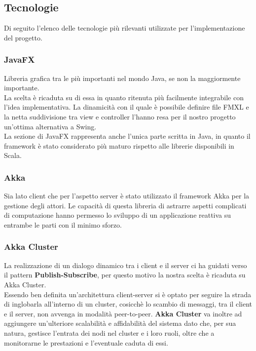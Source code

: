         \subsection{Tecnologie}\label{subsec:technologies}
        Di seguito l'elenco delle tecnologie più rilevanti utilizzate per l'implementazione del progetto.
	  \subsubsection{JavaFX}\label{subsub:tecnologie:javafx}
	    Libreria grafica tra le più importanti nel mondo Java, se non la maggiormente importante.
	    \\
	    La scelta è ricaduta su di essa in quanto ritenuta più facilmente integrabile con l'idea implementativa.
	    La dinamicità con il quale è possibile definire file FMXL e la netta suddivisione tra view e controller l'hanno resa per il nostro progetto un'ottima alternativa a Swing. \\
	    La sezione di JavaFX rappresenta anche l'unica parte scritta in Java, in quanto il framework è stato considerato più maturo rispetto alle librerie disponibili in Scala.

	 \subsubsection{Akka}\label{subsub:tecnologie:akka}
	   Sia lato client che per l'aspetto server è stato utilizzato il framework Akka per la gestione degli attori.
	   Le capacità di questa libreria di astrarre aspetti complicati di computazione hanno permesso lo sviluppo di un applicazione reattiva su entrambe le parti con il minimo sforzo.


	 \subsubsection{Akka Cluster}\label{subsub:tecnologie:akkacluster}
	   La realizzazione di un dialogo dinamico tra i client e il server ci ha guidati verso il pattern \textbf{Publish-Subscribe}, per questo motivo la nostra scelta è ricaduta su Akka Cluster.
	   \\
	   Essendo ben definita un'architettura client-server si è optato per seguire la strada di inglobarla all'interno di un cluster, cosicchè lo scambio di messaggi, tra il client e il server, non avvenga in modalità peer-to-peer.
	   \textbf{Akka Cluster} va inoltre ad aggiungere un'ulteriore scalabilità e affidabilità del sistema dato che, per sua natura, gestisce l'entrata dei nodi nel cluster e i loro ruoli, oltre che a monitorarne le prestazioni e l'eventuale caduta di essi.
